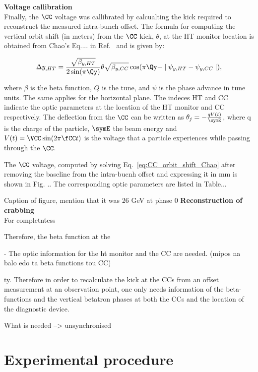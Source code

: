  

\newpage


\normalsize{\textbf{Voltage callibration}}\\
Finally, the $\CC$ voltage was callibrated by calcualting the kick required to reconstruct the measured intra-bunch offset. The formula for computing the vertical orbit shift (in meters) from the $\CC$ kick, $\theta$, at the HT monitor location is obtained from Chao's Eq.... in Ref.~\cite{Chao:1490001} and is given by:

\begin{equation}\label{eq:CC_orbit_shift_Chao}
   \Delta y_{,HT} = \frac{\sqrt{\beta_{y, HT}}}{2 \sin(\pi \Qy)} \theta \sqrt{\beta_{y, CC}} \cos(\pi \Qy - \mid \psi_{y, HT} - \psi_{y, CC} \mid),
\end{equation}

where $\beta$ is the beta function, $Q$ is the tune, and $\psi$ is the phase advance in tune units. The same applies for the horizontal plane. The indeces HT and CC indicate the optic parameters at the location of the HT monitor and CC respectively. The deflection from the $\CC$ can be written as $\theta_j = - \frac{q V(t)}{\symE}$, where q is the charge of the particle, $\symE$ the beam energy and $V(t) = \VCC \sin(2 \pi \fCC t) $ is the voltage that a particle experiences while passing through the $\CC$. 

The $\CC$ voltage, computed by solving Eq.~\ref{eq:CC_orbit_shift_Chao} after removing the baseline from the intra-bucnh offset and expressing it in mm is shown in Fig. .. The corresponding optic parameters are listed in Table...


Caption of figure, mention that it was 26 GeV at phase 0
\normalsize{\textbf{Reconstruction of crabbing}}\\
For completntess


Therefore, the beta function at the 


- The optic information for the ht monitor and the CC are needed.  (mipos na balo edo ta beta functions tou CC)

ty. Therefore in order
to recalculate the kick at the CCs from an offset measurement at an observation point, one only needs information of
the beta-functions and the vertical betatron phases at both
the CCs and the location of the diagnostic device.


\newpage



What is needed --> unsynchronised


\section{Experimental procedure}

